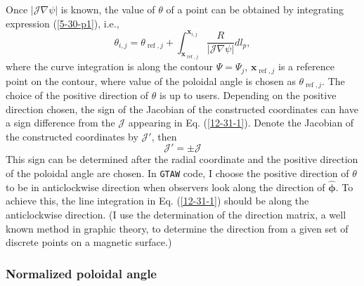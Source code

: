 \documentclass{llncs}
\newcommand{\tmmathbf}[1]{\ensuremath{\boldsymbol{#1}}}
\newcommand{\tmop}[1]{\ensuremath{\operatorname{#1}}}
\begin{document}
Once $|\mathcal{J} \nabla \psi |$ is known, the value of $\theta$ of a point
can be obtained by integrating expression (\ref{5-30-p1}), i.e.,
\begin{equation}
  \label{12-31-1} \theta_{i, j} = \theta_{\tmop{ref}, j} +
  \int_{\mathbf{x}_{\tmop{ref}, j}}^{\mathbf{x}_{i, j}} \frac{R}{|\mathcal{J}
  \nabla \psi |} d l_p,
\end{equation}
where the curve integration is along the contour $\Psi = \Psi_j$,
$\mathbf{x}_{\tmop{ref}, j}$ is a reference point on the contour, where value
of the poloidal angle is chosen as $\theta_{\tmop{ref}, j}$. The choice of the
positive direction of $\theta$ is up to users. Depending on the positive
direction chosen, the sign of the Jacobian of the constructed coordinates can
have a sign difference from the $\mathcal{J}$ appearing in Eq.
(\ref{12-31-1}). Denote the Jacobian of the constructed coordinates by
$\mathcal{J}'$, then
\begin{equation}
  \mathcal{J}' = \pm \mathcal{J}
\end{equation}
This sign can be determined after the radial coordinate and the positive
direction of the poloidal angle are chosen. In {\texttt{GTAW}} code, I
choose the positive direction of $\theta$ to be in anticlockwise direction
when observers look along the direction of $\hat{\tmmathbf{\phi}}$. To achieve
this, the line integration in Eq. (\ref{12-31-1}) should be along the
anticlockwise direction. (I use the determination of the direction matrix, a
well known method in graphic theory, to determine the direction from a given
set of discrete points on a magnetic surface.)

\subsubsection{Normalized poloidal angle}\label{17-10-19-2}
\end{document}
